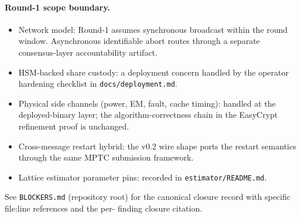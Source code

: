 \paragraph{Round-1 scope boundary.}
\begin{itemize}[leftmargin=*, itemsep=0pt]
\item Network model: Round-1 assumes synchronous broadcast within
the round window. Asynchronous identifiable abort routes through
a separate consensus-layer accountability artifact.
\item HSM-backed share custody: a deployment concern handled by
the operator hardening checklist in \texttt{docs/deployment.md}.
\item Physical side channels (power, EM, fault, cache timing):
handled at the deployed-binary layer; the algorithm-correctness
chain in the EasyCrypt refinement proof is unchanged.
\item Cross-message restart hybrid: the v0.2 wire shape ports the
restart semantics through the same MPTC submission framework.
\item Lattice estimator parameter pins: recorded in
\texttt{estimator/README.md}.
\end{itemize}

See \texttt{BLOCKERS.md} (repository root) for the canonical
closure record with specific file:line references and the per-
finding closure citation.
